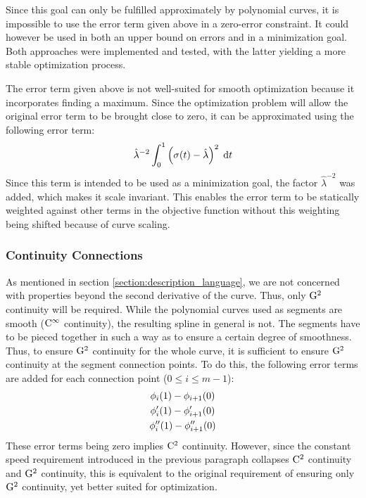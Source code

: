 \documentclass[a4paper]{article}
\begin{document}
				Since this goal can only be fulfilled approximately by polynomial curves, it is impossible to use the error term given above in a zero-error constraint. It could however be used in both an upper bound on errors and in a minimization goal. Both approaches were implemented and tested, with the latter yielding a more stable optimization process.

				The error term given above is not well-suited for smooth optimization because it incorporates finding a maximum. Since the optimization problem will allow the original error term to be brought close to zero, it can be approximated using the following error term:
				\begin{equation*}
					\hat{\lambda}^{-2}\int_{0}^{1} \left( \sigma\!\left( t \right) - \hat{\lambda} \right)^2 \; \mathrm{d}t
				\end{equation*}
				Since this term is intended to be used as a minimization goal, the factor \(\hat{\lambda}^{-2}\) was added, which makes it scale invariant. This enables the error term to be statically weighted against other terms in the objective function without this weighting being shifted because of curve scaling.

			\subsubsection{Continuity Connections}
			\label{section:continuity_connections}

				As mentioned in section \ref{section:description_language}, we are not concerned with properties beyond the second derivative of the curve. Thus, only \(\mathrm{G}^{2}\) continuity will be required. While the polynomial curves used as segments are smooth (\(\mathrm{C}^{\infty}\) continuity), the resulting spline in general is not. The segments have to be pieced together in such a way as to ensure a certain degree of smoothness. Thus, to ensure \(\mathrm{G}^{2}\) continuity for the whole curve, it is sufficient to ensure \(\mathrm{G}^{2}\) continuity at the segment connection points. To do this, the following error terms are added for each connection point (\(0 \leq i \leq m - 1\)):
				\begin{equation*}
					\begin{gathered}
						\phi_i\!\left( 1 \right) - \phi_{i + 1}\!\left( 0 \right)\\
						\phi'_i\!\left( 1 \right) - \phi'_{i + 1}\!\left( 0 \right)\\
						\phi''_i\!\left( 1 \right) - \phi''_{i + 1}\!\left( 0 \right)
					\end{gathered}
				\end{equation*}
				These error terms being zero implies \(\mathrm{C}^{2}\) continuity. However, since the constant speed requirement introduced in the previous paragraph collapses \(\mathrm{C}^{2}\) continuity and \(\mathrm{G}^{2}\) continuity, this is equivalent to the original requirement of ensuring only \(\mathrm{G}^{2}\) continuity, yet better suited for optimization. 
\end{document}
